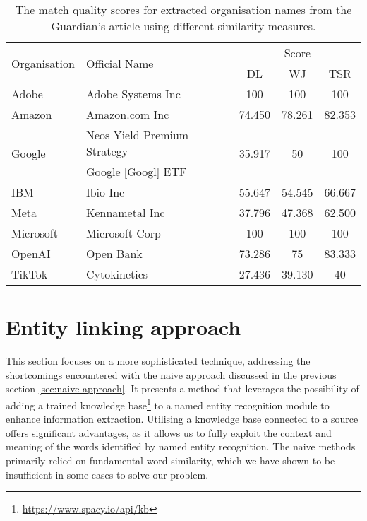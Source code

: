 \begin{table}[ht]
    \centering
    \caption{The match quality scores for extracted organisation names from the Guardian's article using different similarity measures.}
    \label{table:combined-scores}
    \begin{tabular}{l l c c c}
        \hline
        \multirow{2}{*}{Organisation} & \multirow{2}{*}{Official Name} & \multicolumn{3}{c}{Score}\\
        \cline{3-5}
        & & DL & WJ & TSR \\
        \hline
        Adobe & Adobe Systems Inc & 100 & 100 & 100 \\
        Amazon & Amazon.com Inc & 74.450 & 78.261 & 82.353 \\
        \multirow{2}{*}{Google} & Neos Yield Premium Strategy& \multirow{2}{*}{35.917} & \multirow{2}{*}{50} & \multirow{2}{*}{100} \\
        & Google [Googl] ETF & & & \\
        IBM & Ibio Inc & 55.647 & 54.545 & 66.667 \\
        Meta & Kennametal Inc & 37.796 & 47.368 & 62.500 \\
        Microsoft & Microsoft Corp & 100 & 100 & 100 \\
        OpenAI & Open Bank & 73.286 & 75 & 83.333 \\
        TikTok & Cytokinetics & 27.436 & 39.130 & 40 \\
        \hline
    \end{tabular}
\end{table}

\section{Entity linking approach}
\label{sec:entity-linking-approach}
This section focuses on a more sophisticated technique, addressing the shortcomings encountered with the naive approach discussed in the previous section \ref{sec:naive-approach}. It presents a method that leverages the possibility of adding a trained knowledge base\footnote{\href{https://www-spacy.io/api/kb}{https://www.spacy.io/api/kb}} to a named entity recognition module to enhance information extraction. Utilising a knowledge base connected to a source offers significant advantages, as it allows us to fully exploit the context and meaning of the words identified by named entity recognition. The naive methods primarily relied on fundamental word similarity, which we have shown to be insufficient in some cases to solve our problem.

